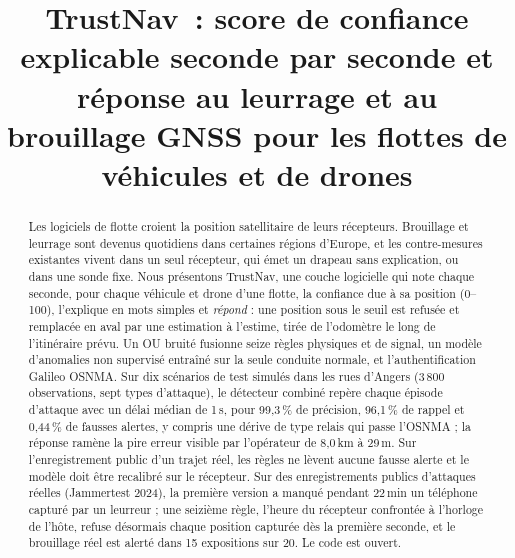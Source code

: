 \documentclass[conference]{IEEEtran}
\newcommand{\sys}{TrustNav}
\begin{document}
\title{\sys\ : score de confiance explicable seconde par seconde et réponse au leurrage et au brouillage GNSS pour les flottes de véhicules et de drones}

\author{
}

\maketitle

\begin{abstract}
Les logiciels de flotte croient la position satellitaire de leurs récepteurs. Brouillage et leurrage sont devenus quotidiens dans certaines régions d'Europe, et les contre-mesures existantes vivent dans un seul récepteur, qui émet un drapeau sans explication, ou dans une sonde fixe. Nous présentons \sys, une couche logicielle qui note chaque seconde, pour chaque véhicule et drone d'une flotte, la confiance due à sa position (0--100), l'explique en mots simples et \emph{répond} : une position sous le seuil est refusée et remplacée en aval par une estimation à l'estime, tirée de l'odomètre le long de l'itinéraire prévu. Un OU bruité fusionne seize règles physiques et de signal, un modèle d'anomalies non supervisé entraîné sur la seule conduite normale, et l'authentification Galileo OSNMA. Sur dix scénarios de test simulés dans les rues d'Angers (3\,800 observations, sept types d'attaque), le détecteur combiné repère chaque épisode d'attaque avec un délai médian de 1\,s, pour 99,3\,\% de précision, 96,1\,\% de rappel et 0,44\,\% de fausses alertes, y compris une dérive de type relais qui passe l'OSNMA ; la réponse ramène la pire erreur visible par l'opérateur de 8,0\,km à 29\,m. Sur l'enregistrement public d'un trajet réel, les règles ne lèvent aucune fausse alerte et le modèle doit être recalibré sur le récepteur. Sur des enregistrements publics d'attaques réelles (Jammertest 2024), la première version a manqué pendant 22\,min un téléphone capturé par un leurreur ; une seizième règle, l'heure du récepteur confrontée à l'horloge de l'hôte, refuse désormais chaque position capturée dès la première seconde, et le brouillage réel est alerté dans 15 expositions sur 20. Le code est ouvert.
\end{abstract}
\end{document}
